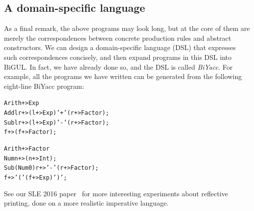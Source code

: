 \subsection{A domain-specific language}

As a final remark, the above programs may look long, but at the core of them are merely the correspondences between concrete production rules and abstract constructors.
We can design a domain-specific language (DSL) that expresses such correspondences concisely, and then expand programs in this DSL into BiGUL.
In fact, we have already done so, and the DSL is called \emph{BiYacc}.
For example, all the programs we have written can be generated from the following eight-line BiYacc program:
\begin{alltt}
  Arith +> Exp
  Add l r +> (l +> Exp) '+' (r +> Factor);
  Sub l r +> (l +> Exp) '-' (r +> Factor);
  f       +> (f +> Factor);

  Arith +> Factor
  Num n         +> (n +> Int);
  Sub (Num 0) r +> '-' (r +> Factor);
  f             +> '(' (f +> Exp) ')';
\end{alltt}
See our SLE 2016 paper~\cite{Zhu-BiYacc} for more interesting experiments about reflective printing, done on a more realistic imperative language.
